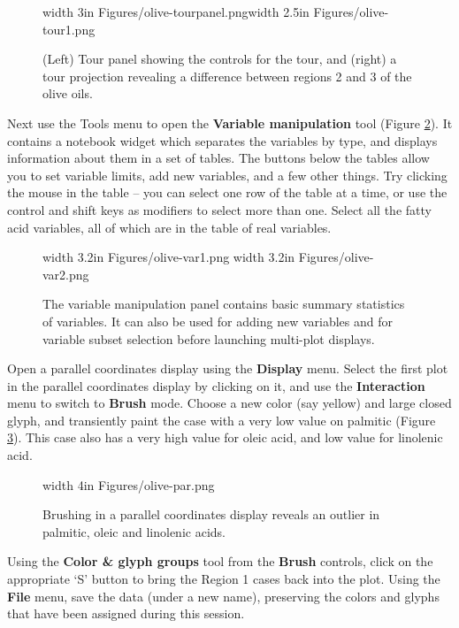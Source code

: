 \documentclass[11pt]{article}
\def\Widget#1{\textbf{#1}}
\begin{document}
\begin{figure}[htp]
\centerline{\pdfimage width 3in {Figures/olive-tourpanel.png}\hspace{0.2in}\pdfimage width 2.5in {Figures/olive-tour1.png}}
\caption{(Left) Tour panel showing the controls for the tour, and
(right) a tour projection revealing a difference between regions 2 and
3 of the olive oils.}
\label{fig6}
\end{figure}

Next use the Tools menu to open the \Widget{Variable manipulation} tool
(Figure \ref{fig4}).  It contains a notebook widget which separates
the variables by type, and displays information about them in a set
of tables.  The buttons below the tables allow you to set variable
limits, add new variables, and a few other things.  Try clicking the
mouse in the table -- you can select one row of the table at a time,
or use the control and shift keys as modifiers to select more than one.
Select all the fatty acid variables, all of which are in the table
of real variables.

\begin{figure}[htp]
\centerline{\pdfimage width 3.2in {Figures/olive-var1.png}
\pdfimage width 3.2in {Figures/olive-var2.png}}
\caption{The variable manipulation panel contains basic summary 
statistics of variables. It can also be used for adding new variables
and for variable subset selection before launching multi-plot
displays.
}%
\label{fig4}
\end{figure}

Open a parallel coordinates display using the \Widget{Display} menu.
Select the first plot in the parallel coordinates display by
clicking on it, and use the \Widget{Interaction} menu to switch to 
\Widget{Brush} mode. Choose a new color (say yellow) and large closed glyph,
and transiently paint the case with a very low value on palmitic
(Figure \ref{fig7}). This case also has a very high value for oleic
acid, and low value for linolenic acid.

\begin{figure}[htp]
\centerline{\pdfimage width 4in {Figures/olive-par.png}}
\caption{Brushing in a parallel coordinates display reveals an outlier in 
palmitic, oleic and linolenic acids.}
\label{fig7}
\end{figure}

Using the \Widget{Color \& glyph groups} tool from the \Widget{Brush}
controls, click on the appropriate `S' button to bring the Region 1
cases back into the plot.  Using the \Widget{File} menu, save the data
(under a new name), preserving the colors and glyphs that have been
assigned during this session.
\end{document}
